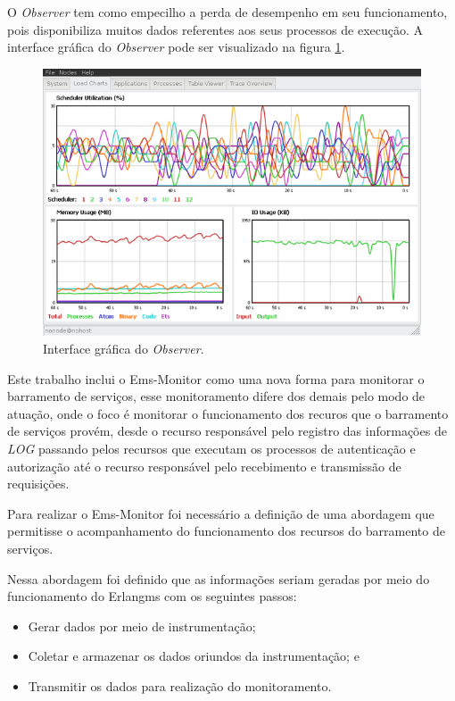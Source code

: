 O \textit{Observer} tem como empecilho a perda de desempenho em seu funcionamento, pois disponibiliza muitos dados referentes aos seus processos de execução. A interface gráfica do \textit{Observer} pode ser visualizado na figura \ref{fun:fig:observer}. 

\begin{figure}[H]
	\begin{center}
	\includegraphics[scale = 0.70]{img/observerGo.jpg}
		\caption{Interface gráfica do \textit{Observer}.}
		\label{fun:fig:observer}
	\end{center}
\end{figure}

Este trabalho inclui o Ems-Monitor como uma nova forma para monitorar o barramento de serviços, esse monitoramento difere dos demais pelo modo de atuação, onde o foco é monitorar o funcionamento dos recuros que o barramento de serviços provém, desde o recurso responsável pelo registro das informações de \textit{LOG} passando pelos recursos que executam os processos de autenticação e autorização até o recurso responsável pelo recebimento e transmissão de requisições. 

Para realizar o Ems-Monitor foi necessário a definição de uma abordagem que permitisse o acompanhamento do funcionamento dos recursos do barramento de serviços. 

Nessa abordagem foi definido que as informações seriam geradas por meio do funcionamento do Erlangms com os seguintes passos:

\begin{itemize}
    \item Gerar dados por meio de instrumentação;
    \item Coletar e armazenar os dados oriundos da instrumentação; e
    \item Transmitir os dados para realização do monitoramento. 
\end{itemize}

